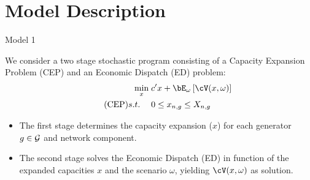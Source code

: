   \section{Model Description}
  
  \begin{frame}{Model 1}
  
  We consider a two stage stochastic program consisting of a Capacity Expansion Problem (CEP) and an Economic Dispatch (ED) problem:
    \begin{align*}
      \min_{x} \; & c'x + \bE_{\omega}\left[\cV(x,\omega)\right] \\  \tag{CEP}
      s.t. \;   \quad  & 0 \leq x_{n,g} \leq X_{n,g}
    \end{align*}
    \begin{itemize}
      \pause
      \item The first stage determines the capacity expansion (\(x\)) for each generator \(g \in \mathcal{G} \) and network component.\pause
      \item The second stage solves the Economic Dispatch (ED) in function of the expanded capacities \(x\) and the scenario \(\omega\), yielding \(\cV(x,\omega)\) as solution.
    \end{itemize}
  \end{frame}
  
  
  
